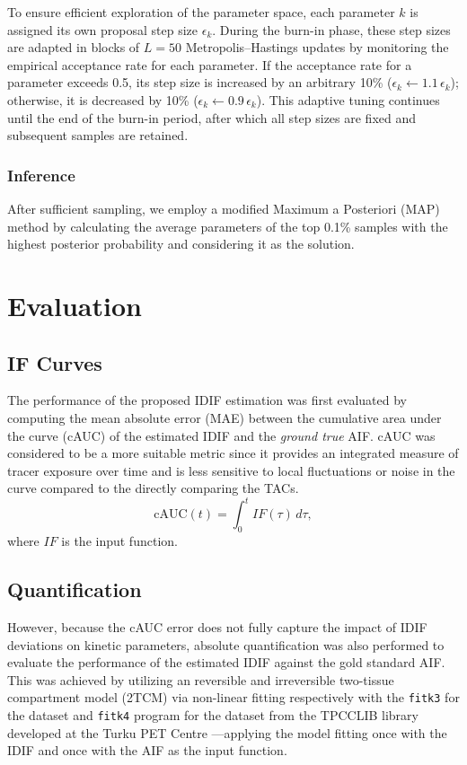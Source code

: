 To ensure efficient exploration of the parameter space, each parameter \( k \) is assigned its own proposal step size \( \epsilon_k \).
During the burn-in phase, these step sizes are adapted in blocks of \( L = 50 \) Metropolis–Hastings updates by monitoring the empirical acceptance rate for each parameter.
If the acceptance rate for a parameter exceeds 0.5, its step size is increased by an arbitrary 10\% (\( \epsilon_k \leftarrow 1.1\,\epsilon_k \)); otherwise, it is decreased by 10\% (\( \epsilon_k \leftarrow 0.9\,\epsilon_k \)).
This adaptive tuning continues until the end of the burn-in period, after which all step sizes are fixed and subsequent samples are retained.

\subsubsection{Inference}
After sufficient sampling, we employ a modified Maximum a Posteriori (MAP) method by calculating the average parameters of the top 0.1\% samples with the highest posterior probability and considering it as the solution.



\section{Evaluation}
\subsection{IF Curves}
The performance of the proposed IDIF estimation was first evaluated by computing the mean absolute error (MAE) between the cumulative area under the curve (cAUC) of the estimated IDIF and the \textit{ground true} AIF. cAUC was considered to be a more suitable metric since it provides an integrated measure of tracer exposure over time and is less sensitive to local fluctuations or noise in the curve compared to the directly comparing the TACs.
\begin{equation}
	\textrm{cAUC}(t) =\int_{0}^{t} IF(\tau) \, d\tau,  
\end{equation}
where \(IF\) is the input function.

\subsection{Quantification}
However, because the cAUC error does not fully capture the impact of IDIF deviations on kinetic parameters, absolute quantification was also performed to evaluate the performance of the estimated IDIF against the gold standard AIF.
This was achieved by utilizing an reversible and irreversible two-tissue compartment model (2TCM) via non-linear fitting respectively with the \texttt{fitk3} for the \fdg dataset and \texttt{fitk4} program for the \yohimbine dataset from the TPCCLIB library developed at the Turku PET Centre \cite{oikonen2018tpcclib}—applying the model fitting once with the IDIF and once with the AIF as the input function.

